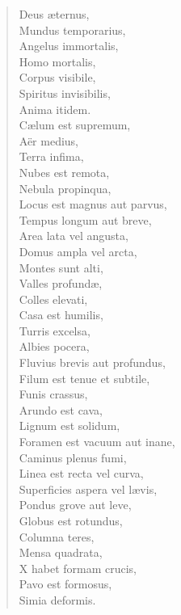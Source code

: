 \documentclass[12pt,  postvopaper]{memoir}
\begin{document}
\begin{verse}

  Deus æternus,\\
  Mundus temporarius,\\
  Angelus immortalis,\\
  Homo mortalis,\\
  Corpus visibile,\\
  Spiritus invisibilis,\\
  Anima itidem.\\
  Cælum est supremum,\\
  Aër medius,\\
  Terra infima,\\
  Nubes est remota,\\
  Nebula propinqua,\\
  Locus est magnus aut parvus,\\
  Tempus longum aut breve,\\
  Area lata vel angusta,\\
  Domus ampla vel arcta,\\
  Montes sunt alti,\\
  Valles profundæ,\\
  Colles elevati,\\
  Casa est humilis,\\
  Turris excelsa,\\
  Albies pocera,\\
  Fluvius brevis aut profundus,\\
  Filum est tenue et subtile,\\
  Funis crassus,\\
  Arundo est cava,\\
  Lignum est solidum,\\
  Foramen est vacuum aut inane,\\
  Caminus plenus fumi,\\
  Linea est recta vel curva,\\
  Superficies aspera vel lævis,\\
  Pondus grove aut leve,\\
  Globus est rotundus,\\
  Columna teres,\\
  Mensa quadrata,\\
  X habet formam crucis,\\
  Pavo est formosus,\\
  Simia deformis.\\
\end{verse}
\end{document}
